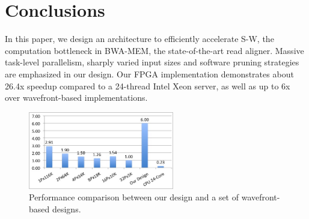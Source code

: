 \section{Conclusions} 
\label{sec:conclusions}
In this paper, we design an architecture to efficiently accelerate S-W, the computation bottleneck in BWA-MEM, the state-of-the-art read aligner. 
Massive task-level parallelism, sharply varied input sizes and software pruning strategies are emphasized in our design. 
Our FPGA implementation demonstrates about 26.4x speedup compared to a 24-thread Intel Xeon server, as well as up to 6x over wavefront-based implementations. 

\begin{figure}[!hbt]
	\begin{center}
		\includegraphics[width=2.5in]{Figures/F2C5.jpg}
		\caption {Performance comparison between our design and a set of wavefront-based designs.}
		\label{fig:F2C5}
	\end{center}
\end{figure}
\vspace{-10pt}

